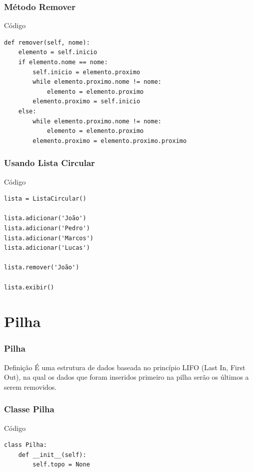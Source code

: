 \documentclass{beamer}
\begin{document}
\begin{frame}[fragile]
\frametitle{Método Remover}

\begin{exampleblock}{Código}

\begin{lstlisting}
def remover(self, nome): 
    elemento = self.inicio
    if elemento.nome == nome:
        self.inicio = elemento.proximo
        while elemento.proximo.nome != nome:
            elemento = elemento.proximo
        elemento.proximo = self.inicio
    else:
        while elemento.proximo.nome != nome:
            elemento = elemento.proximo
        elemento.proximo = elemento.proximo.proximo
\end{lstlisting}
\end{exampleblock}
\end{frame}

\begin{frame}[fragile]
\frametitle{Usando Lista Circular}

\begin{exampleblock}{Código}

\begin{lstlisting}
lista = ListaCircular()

lista.adicionar('João')
lista.adicionar('Pedro')
lista.adicionar('Marcos')
lista.adicionar('Lucas')

lista.remover('João')

lista.exibir()
\end{lstlisting}
\end{exampleblock}
\end{frame}

\section{Pilha}

\begin{frame}
\frametitle{Pilha}

\begin{block}{Definição}
	É uma estrutura de dados baseada no princípio LIFO (Last In, First Out), na qual os dados que foram inseridos primeiro na pilha serão os últimos a serem removidos.
\end{block}
\end{frame}

\begin{frame}[fragile]
\frametitle{Classe Pilha}

\begin{exampleblock}{Código}

\begin{lstlisting}
class Pilha:
    def __init__(self):
        self.topo = None
\end{lstlisting}
\end{exampleblock}
\end{frame}
\end{document}
